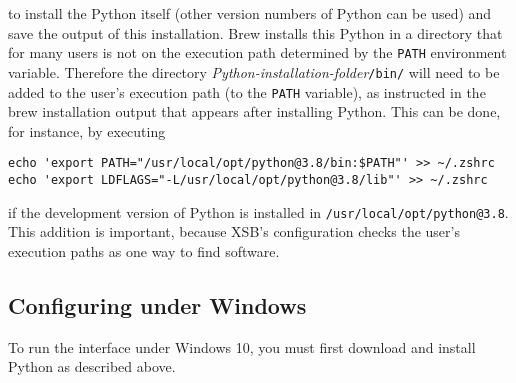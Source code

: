 \noindent
to install the Python itself (other version numbers of Python can be used)
and save the output of this installation.  Brew installs this Python in a
directory that for many users is not on the execution path determined by
the \texttt{PATH} environment variable.  Therefore the directory
\emph{Python-installation-folder}\texttt{/bin/} will need to be added to
the user's execution path (to the \texttt{PATH} variable), as instructed in
the brew installation output that appears after installing Python.
This can be done, for instance, by executing
\begin{verbatim}
echo 'export PATH="/usr/local/opt/python@3.8/bin:$PATH"' >> ~/.zshrc
echo 'export LDFLAGS="-L/usr/local/opt/python@3.8/lib"' >> ~/.zshrc
\end{verbatim}
if the development version of
Python is installed in \texttt{/usr/local/opt/python@3.8}. This
addition is important, because XSB's configuration checks the user's
execution paths as one way to find software.

%
%
%
%
%
\subsection{Configuring \janusplg{} under Windows}

To run the \janusplg{} interface under Windows 10, you must first
download and install Python as described above.

